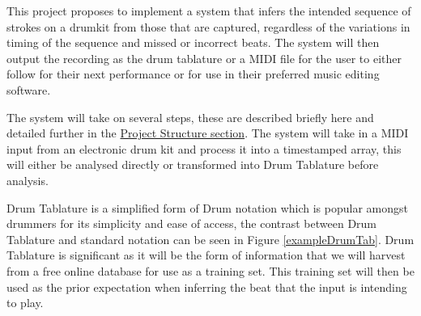 \documentclass[12pt,a4]{article}
\begin{document}
This project proposes to implement a system that infers the intended sequence of strokes on a drumkit from those that are captured, regardless of the variations in timing of the sequence and missed or incorrect beats. The system will then output the recording as the drum tablature or a MIDI\footnotemark {} file for the user to either follow for their next performance or for use in their preferred music editing software.

The system will take on several steps, these are described briefly here and detailed further in the \hyperref[sec:ProjectStructure]{Project Structure section}. The system will take in a MIDI input from an electronic drum kit and process it into a timestamped array, this will either be analysed directly or transformed into Drum Tablature before analysis.

Drum Tablature is a simplified form of Drum notation which is popular amongst drummers for its simplicity and ease of access, the contrast between Drum Tablature and standard notation can be seen in Figure \ref{exampleDrumTab}. Drum Tablature is significant as it will be the form of information that we will harvest from a free online database\footnotemark {} for use as a training set. This training set will then be used as the prior expectation when inferring the beat that the input is intending to play.
\end{document}
